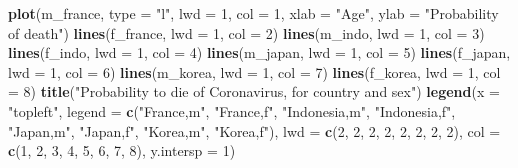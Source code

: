 \documentclass[
]{article}
\newenvironment{Shaded}{\begin{snugshade}}{\end{snugshade}}
\newcommand{\DataTypeTok}[1]{\textcolor[rgb]{0.13,0.29,0.53}{#1}}
\newcommand{\DecValTok}[1]{\textcolor[rgb]{0.00,0.00,0.81}{#1}}
\newcommand{\KeywordTok}[1]{\textcolor[rgb]{0.13,0.29,0.53}{\textbf{#1}}}
\newcommand{\NormalTok}[1]{#1}
\newcommand{\StringTok}[1]{\textcolor[rgb]{0.31,0.60,0.02}{#1}}
\begin{document}
\begin{Shaded}
\begin{Highlighting}[]
\KeywordTok{plot}\NormalTok{(m_france, }\DataTypeTok{type =} \StringTok{"l"}\NormalTok{, }\DataTypeTok{lwd =} \DecValTok{1}\NormalTok{, }\DataTypeTok{col =} \DecValTok{1}\NormalTok{, }\DataTypeTok{xlab =} \StringTok{"Age"}\NormalTok{, }\DataTypeTok{ylab =} \StringTok{"Probability of death"}\NormalTok{)}
\KeywordTok{lines}\NormalTok{(f_france, }\DataTypeTok{lwd =} \DecValTok{1}\NormalTok{, }\DataTypeTok{col =} \DecValTok{2}\NormalTok{)}
\KeywordTok{lines}\NormalTok{(m_indo, }\DataTypeTok{lwd =} \DecValTok{1}\NormalTok{, }\DataTypeTok{col =} \DecValTok{3}\NormalTok{)}
\KeywordTok{lines}\NormalTok{(f_indo, }\DataTypeTok{lwd =} \DecValTok{1}\NormalTok{, }\DataTypeTok{col =} \DecValTok{4}\NormalTok{)}
\KeywordTok{lines}\NormalTok{(m_japan, }\DataTypeTok{lwd =} \DecValTok{1}\NormalTok{, }\DataTypeTok{col =} \DecValTok{5}\NormalTok{)}
\KeywordTok{lines}\NormalTok{(f_japan, }\DataTypeTok{lwd =} \DecValTok{1}\NormalTok{, }\DataTypeTok{col =} \DecValTok{6}\NormalTok{)}
\KeywordTok{lines}\NormalTok{(m_korea, }\DataTypeTok{lwd =} \DecValTok{1}\NormalTok{, }\DataTypeTok{col =} \DecValTok{7}\NormalTok{)}
\KeywordTok{lines}\NormalTok{(f_korea, }\DataTypeTok{lwd =} \DecValTok{1}\NormalTok{, }\DataTypeTok{col =} \DecValTok{8}\NormalTok{)}
\KeywordTok{title}\NormalTok{(}\StringTok{"Probability to die of Coronavirus, for country and sex"}\NormalTok{)}
\KeywordTok{legend}\NormalTok{(}\DataTypeTok{x =} \StringTok{"topleft"}\NormalTok{, }\DataTypeTok{legend =} \KeywordTok{c}\NormalTok{(}\StringTok{"France,m"}\NormalTok{, }\StringTok{"France,f"}\NormalTok{, }\StringTok{"Indonesia,m"}\NormalTok{, }\StringTok{"Indonesia,f"}\NormalTok{, }
    \StringTok{"Japan,m"}\NormalTok{, }\StringTok{"Japan,f"}\NormalTok{, }\StringTok{"Korea,m"}\NormalTok{, }\StringTok{"Korea,f"}\NormalTok{), }\DataTypeTok{lwd =} \KeywordTok{c}\NormalTok{(}\DecValTok{2}\NormalTok{, }\DecValTok{2}\NormalTok{, }\DecValTok{2}\NormalTok{, }\DecValTok{2}\NormalTok{, }\DecValTok{2}\NormalTok{, }\DecValTok{2}\NormalTok{, }\DecValTok{2}\NormalTok{, }\DecValTok{2}\NormalTok{), }
    \DataTypeTok{col =} \KeywordTok{c}\NormalTok{(}\DecValTok{1}\NormalTok{, }\DecValTok{2}\NormalTok{, }\DecValTok{3}\NormalTok{, }\DecValTok{4}\NormalTok{, }\DecValTok{5}\NormalTok{, }\DecValTok{6}\NormalTok{, }\DecValTok{7}\NormalTok{, }\DecValTok{8}\NormalTok{), }\DataTypeTok{y.intersp =} \DecValTok{1}\NormalTok{)}
\end{Highlighting}
\end{Shaded}
\end{document}
